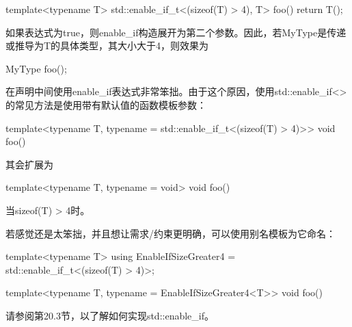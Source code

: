 \begin{cpp}
template<typename T>
std::enable_if_t<(sizeof(T) > 4), T>
foo() {
	return T();
}
\end{cpp}

如果表达式为true，则enable\_if构造展开为第二个参数。因此，若MyType是传递或推导为T的具体类型，其大小大于4，则效果为

\begin{cpp}
MyType foo();
\end{cpp}

在声明中间使用enable\_if表达式非常笨拙。由于这个原因，使用std::enable\_if<>的常见方法是使用带有默认值的函数模板参数： 

\begin{cpp}
template<typename T,
		typename = std::enable_if_t<(sizeof(T) > 4)>>
void foo() {}
\end{cpp}

其会扩展为

\begin{cpp}
template<typename T,
		typename = void>
void foo() {}
\end{cpp}

当sizeof(T) > 4时。

若感觉还是太笨拙，并且想让需求/约束更明确，可以使用别名模板为它命名：

\begin{cpp}
template<typename T>
using EnableIfSizeGreater4 = std::enable_if_t<(sizeof(T) > 4)>;

template<typename T,
	typename = EnableIfSizeGreater4<T>>
void foo() {}
\end{cpp}

请参阅第20.3节，以了解如何实现std::enable\_if。










